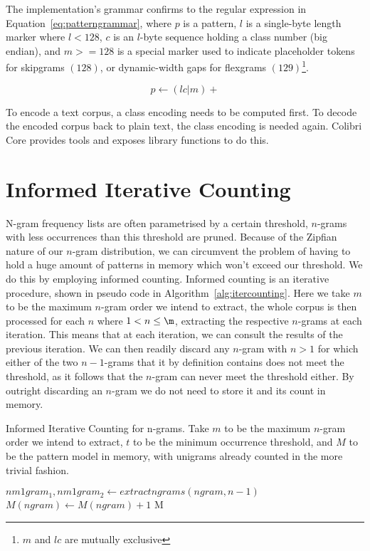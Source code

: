The implementation's grammar confirms to the regular expression in
Equation~\ref{eq:patterngrammar}, where $p$ is a pattern, $l$ is a single-byte
length marker where $l<128$, $c$ is an $l$-byte sequence holding a class number
(big endian), and $m>=128$ is a special marker used to indicate placeholder
tokens for skipgrams $(128)$, or dynamic-width gaps for flexgrams
$(129)$\footnote{$m$ and $lc$ are mutually exclusive}.

\begin{equation}
\label{eq:patterngrammar}
p \leftarrow (lc|m)+
\end{equation}

To encode a text corpus, a class encoding needs to be computed first. To decode
the encoded corpus back to plain text, the class encoding is needed again.
Colibri Core provides tools and exposes library functions to do this.

\section{Informed Iterative Counting}

N-gram frequency lists are often parametrised by a certain threshold, $n$-grams
with less occurrences than this threshold are pruned. Because of the Zipfian
nature of our $n$-gram distribution, we can circumvent the problem of having to
hold a huge amount of patterns in memory which won't exceed our threshold. We do this by
employing informed counting. Informed counting is an iterative procedure, shown
in pseudo code in Algorithm~\ref{alg:itercounting}. Here we take $m$ to be the maximum
$n$-gram order we intend to extract, the whole corpus is then processed for
each $n$ where $1<n\leq\m$, extracting the respective $n$-grams at each
iteration. This means that at each iteration, we can consult the results of the
previous iteration. We can then readily discard any $n$-gram with $n>1$ for
which either of the two $n-1$-grams that it by definition contains does not
meet the threshold, as it follows that the $n$-gram can never meet the
threshold either. By outright discarding an $n$-gram we do not need to store it
and its count in memory. 


\begin{algorithm} \caption{Informed Iterative Counting for n-grams.  Take $m$
to be the maximum $n$-gram order we intend to extract, $t$ to be the minimum occurrence threshold, and $M$ to be the
pattern model in memory, with unigrams already counted in the more trivial fashion.}
\label{alg:featureextract}
\begin{algorithmic}
            \State  $nm1gram_1, nm1gram_2 \leftarrow extractngrams(ngram,n-1)$
                \State $M(ngram) \leftarrow M(ngram) + 1$
            \EndIf
        \EndFor 
      \EndFor
  \EndFor
  \Return M
\EndFor \\
\end{algorithmic}
\end{algorithm}

